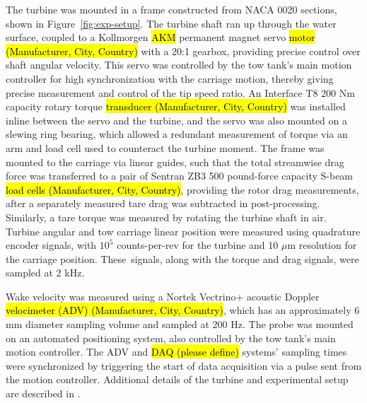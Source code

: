 \documentclass[energies,article,accept,moreauthors,pdftex,10pt,a4paper]{mdpi}
\theoremstyle{mdpi}
\newcounter{ex}
\newcounter{re}
\begin{document}
The turbine was mounted in a frame constructed from NACA 0020 sections, shown in
Figure~\ref{fig:exp-setup}. The turbine shaft ran up through the water surface,
coupled to a Kollmorgen \hl {AKM}
  permanent magnet servo \hl {motor (Manufacturer, City, Country)} with a 20:1 gearbox,
providing precise control over shaft angular velocity. This servo was controlled by the tow
tank's main motion controller for high synchronization with the carriage motion,
thereby giving precise measurement and control of the tip speed ratio. An Interface
T8 200 Nm capacity rotary torque \hl {transducer (Manufacturer, City, Country)} was installed inline between the
servo and the turbine, and the servo was also mounted on a slewing ring bearing,
which allowed a redundant measurement of torque via an arm and load cell used to
counteract the turbine moment. The frame was mounted to the carriage via linear
guides, such that the total streamwise drag force was transferred to a pair of
Sentran ZB3 500 pound-force
 capacity S-beam \hl {load cells (Manufacturer, City, Country)}, providing the rotor drag
measurements, after a separately measured tare drag was subtracted in post-processing. Similarly, a tare torque was measured by rotating the turbine shaft
in air. Turbine angular and tow carriage linear position were measured using
quadrature encoder signals, with $10^5$ counts-per-rev for the turbine and 10 ${\mu}$m resolution for the carriage position. These~signals, along with
the torque and drag signals, were sampled at 2 kHz.



Wake velocity was measured using a Nortek Vectrino+ acoustic Doppler \hl {velocimeter
(ADV)  (Manufacturer, City, Country)}, which has an approximately 6 mm diameter sampling volume and sampled at
200 Hz. The probe was mounted on an automated positioning system, also
controlled by the tow tank's main motion controller. The ADV and \hl {DAQ (please define)} systems'
sampling times were synchronized by triggering the start of data acquisition via
a pulse sent from the motion controller. Additional details of the turbine and
experimental setup are described in \cite{Bachant2015-JoT}.
\end{document}
